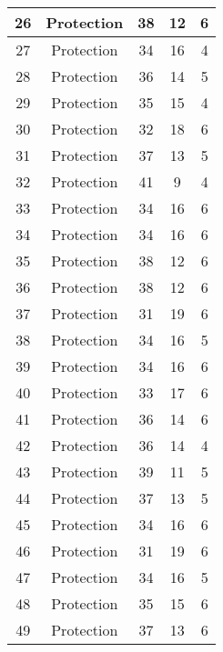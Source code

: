 \documentclass[results.tex]{subfiles}
\begin{document}
\begin{center}
\begin{tabular}{| c || c | c | c | c |}
    \hline
    26 & Protection & 38 & 12 & 6 \\ 
    \hline
    27 & Protection & 34 & 16 & 4 \\ 
    \hline
    28 & Protection & 36 & 14 & 5 \\ 
    \hline
    29 & Protection & 35 & 15 & 4 \\ 
    \hline
    30 & Protection & 32 & 18 & 6 \\ 
    \hline
    31 & Protection & 37 & 13 & 5 \\ 
    \hline
    32 & Protection & 41 & 9 & 4 \\ 
    \hline
    33 & Protection & 34 & 16 & 6 \\ 
    \hline
    34 & Protection & 34 & 16 & 6 \\ 
    \hline
    35 & Protection & 38 & 12 & 6 \\ 
    \hline
    36 & Protection & 38 & 12 & 6 \\ 
    \hline
    37 & Protection & 31 & 19 & 6 \\ 
    \hline
    38 & Protection & 34 & 16 & 5 \\ 
    \hline
    39 & Protection & 34 & 16 & 6 \\ 
    \hline
    40 & Protection & 33 & 17 & 6 \\ 
    \hline
    41 & Protection & 36 & 14 & 6 \\ 
    \hline
    42 & Protection & 36 & 14 & 4 \\ 
    \hline
    43 & Protection & 39 & 11 & 5 \\ 
    \hline
    44 & Protection & 37 & 13 & 5 \\ 
    \hline
    45 & Protection & 34 & 16 & 6 \\ 
    \hline
    46 & Protection & 31 & 19 & 6 \\ 
    \hline
    47 & Protection & 34 & 16 & 5 \\ 
    \hline
    48 & Protection & 35 & 15 & 6 \\ 
    \hline
    49 & Protection & 37 & 13 & 6 \\ 
    \hline   \end{tabular}
\end{center}
\end{document}
